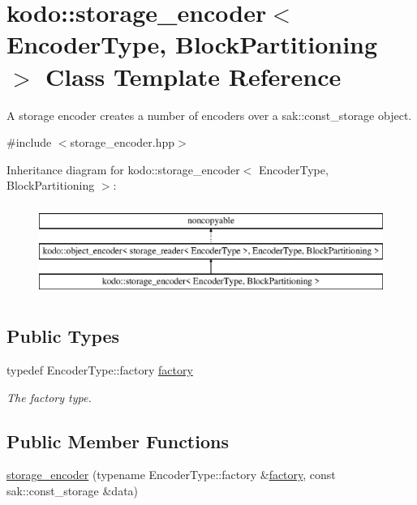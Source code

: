 \hypertarget{classkodo_1_1storage__encoder}{\section{kodo\-:\-:storage\-\_\-encoder$<$ Encoder\-Type, Block\-Partitioning $>$ Class Template Reference}
\label{classkodo_1_1storage__encoder}
}


A storage encoder creates a number of encoders over a sak\-::const\-\_\-storage object.  




{\ttfamily \#include $<$storage\-\_\-encoder.\-hpp$>$}

Inheritance diagram for kodo\-:\-:storage\-\_\-encoder$<$ Encoder\-Type, Block\-Partitioning $>$\-:\begin{figure}[H]
\begin{center}
\leavevmode
\includegraphics[height=3.000000cm]{classkodo_1_1storage__encoder}
\end{center}
\end{figure}
\subsection*{Public Types}
\begin{DoxyCompactItemize}
\item 
\hypertarget{classkodo_1_1storage__encoder_a3d83d8ea600f2203d54bda68fb0a0572}{typedef Encoder\-Type\-::factory \hyperlink{classkodo_1_1storage__encoder_a3d83d8ea600f2203d54bda68fb0a0572}{factory}}\label{classkodo_1_1storage__encoder_a3d83d8ea600f2203d54bda68fb0a0572}

\begin{DoxyCompactList}\small\item\em The factory type. \end{DoxyCompactList}\end{DoxyCompactItemize}
\subsection*{Public Member Functions}
\begin{DoxyCompactItemize}
\item 
\hyperlink{classkodo_1_1storage__encoder_a0cb18dc86a8640678b92bc5c8651f9d4}{storage\-\_\-encoder} (typename Encoder\-Type\-::factory \&\hyperlink{classkodo_1_1storage__encoder_a3d83d8ea600f2203d54bda68fb0a0572}{factory}, const sak\-::const\-\_\-storage \&data)
\end{DoxyCompactItemize}


